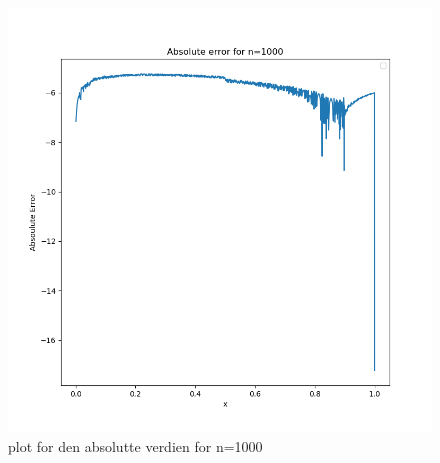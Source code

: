 \documentclass[english,notitlepage]{revtex4-1}  %
\begin{document}
\begin{figure}
	\centering
	\label{abserrn1000}
	\includegraphics[scale=0.5]{abserrn1000.png}
	\caption{plot for den absolutte verdien for n=1000}
\end{figure}
\end{document}
